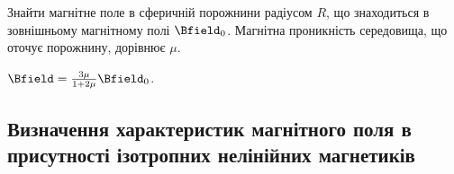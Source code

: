 \begin{problem}
Знайти магнітне поле в сферичній порожнини радіусом $R$, що знаходиться в зовнішньому магнітному полі $\Bfield_0$. Магнітна проникність середовища, що оточує порожнину, дорівнює $\mu$.
\begin{solution}
	$\Bfield = \frac{3\mu}{1 + 2\mu}\Bfield_0$.
\end{solution}
\end{problem}



\subsection*{Визначення характеристик магнітного поля в присутності ізотропних нелінійних маг\-нетиків}


